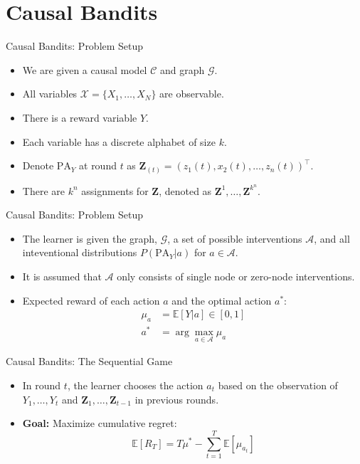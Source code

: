 \documentclass{beamer}
\newcommand{\E}{{\mathbb {E}}}
\newcommand{\bZ}{{\mathbf{Z}}}
\begin{document}
\section{Causal Bandits}
\frame{\sectionpage}
\begin{frame}{Causal Bandits: Problem Setup}
\begin{itemize}
	\item We are given a causal model $\mathcal{C}$ and graph $\mathcal{G}$.
	\item All variables $\mathcal{X} = \{X_1, \dots, X_N\}$ are observable.
	\item There is a reward variable $Y$.
	\item Each variable has a discrete alphabet of size $k$.
		\item Denote $\mathrm{PA}_Y$ at round $t$ as $\bZ_{(t)} = (z_1(t), x_2(t), \dots, z_n(t))^\top$.
	\item There are $k^n$ assignments for $\bZ$, denoted as $\bZ^1, \dots, \bZ^{k^n}$.
	
\end{itemize}
\end{frame}


\begin{frame}{Causal Bandits: Problem Setup}
\begin{itemize}
	\item The learner is given the graph, $\mathcal{G}$, a set of possible interventions $\mathcal{A}$, and all inteventional distributions $P(\mathrm{PA}_Y|a)$ for $a \in \mathcal{A}$.
	\item It is assumed that $\mathcal{A}$ only consists of single node  or zero-node interventions.
	\pause
	\item Expected reward of each action $a$ and the optimal action $a^*$:
	\begin{align*}
		\mu_a &= \E[Y|a] \in [0,1]\\
		a^* &= \arg\max_{a\in\mathcal{A}} \mu_a
	\end{align*}
\end{itemize}
\end{frame}

\begin{frame}{Causal Bandits: The Sequential Game}
	\begin{itemize}
		\item In round $t$, the learner chooses the action $a_t$ based on the observation of $Y_{1}, \dots, Y_{t}$ and $\bZ_{1}, \dots, \bZ_{t-1}$ in previous rounds.
		\pause
		\item \textbf{Goal:} Maximize cumulative regret:
		\begin{equation*}
		\E[R_T] = T\mu^* - \sum_{t = 1}^{T} \E[\mu_{a_t}]
		\end{equation*}
	\end{itemize}
\end{frame}
\end{document}
